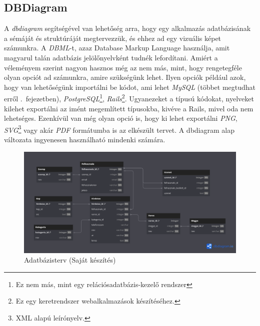 \documentclass[]{thesis-ekf}
\theoremstyle{definition}
\theoremstyle{remark}
\begin{document}
	\subsection{DBDiagram}
	A \emph{dbdiagram} segítségével van lehetőség arra, hogy egy alkalmazás adatbázisának a sémáját és struktúráját megtervezzük, és ehhez ad egy vizuális képet számunkra. A \emph{DBML}-t, azaz Database Markup Language használja, amit magyarul talán adatbázis jelölőnyelvként tudnék lefordítani. Amiért a véleményem szerint nagyon hasznos még az nem más, mint, hogy rengetegféle olyan opciót ad számunkra, amire szükségünk lehet. Ilyen opciók például azok, hogy van lehetőségünk importálni be kódot, ami lehet \emph{MySQL} (többet megtudhat erről .~fejezetben), \emph{PostgreSQL}\footnote{Ez nem más, mint egy relációsadatbázis-kezelő rendszer}, \emph{Rails}\footnote{Ez egy keretrendszer webalkalmazások készítéséhez.}. Ugyanezeket a típusú kódokat, nyelveket kilehet exportálni az imént megemlített típusokba, kivéve a Rails, mivel oda nem lehetséges. Ezenkívül van még olyan opció is, hogy ki lehet exportálni \emph{PNG}, \emph{SVG}\footnote{XML alapú leírónyelv.} vagy akár \emph{PDF} formátumba is az elkészült tervet. A dbdiagram alap változata ingyenesen használható mindenki számára. \cite{Dbdiagram}
	
	\begin{figure}[ht!]
		\centering
		\includegraphics[width=15cm]{./tervezes/dbdiagram}
		\caption{Adatbázisterv (Saját készítés)} 
		\label{dbdiagram}
	\end{figure}
	
\end{document}
